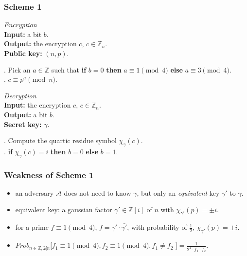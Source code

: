 \documentclass{beamer}
\begin{document}
\begin{frame}
\frametitle{Scheme 1 \cite{p}}
	
		\textit{Encryption} \\

		 \textbf{Input:} a bit $b$. \\
			 \textbf{Output:} the encryption $c$, $c  \in \mathbb{Z}_n$.  \\
			 \textbf{Public key:} $(n,p)$.
			 
			 
		\bigskip
			 
		. Pick an $a \in \mathbb{Z}$ such that \textbf{if} $b =0$ \textbf{then} $a \equiv 1 \pmod{4}$
		\textbf{else}  $a \equiv 3 \pmod{4}$. \\
	    . $c \equiv p^a \pmod{n}$. \\ 
		
		\bigskip
		
		
		\textit{Decryption} \\
		
		 \textbf{Input:} the encryption $c$, $c \in \mathbb{Z}_n$. \\
				 \textbf{Output:} a bit $b$. \\
				 \textbf{Secret key:} $\gamma$.
				 
		\bigskip
			
			
		 . Compute the quartic residue symbol $ \chi_{\gamma} (c)$. \\   
		. \textbf{if} $\chi_{\gamma} (c) =i$ \textbf{then} $b = 0$  \textbf{else} {$b = 1$\;}.\\

\end{frame}


\begin{frame}
\frametitle{Weakness of Scheme 1}

	\begin{itemize}
		\item  an adversary 
		  $\mathcal{A}$ does not need to know $\gamma$, 
		  but only an \textit{equivalent} key $\gamma'$
		  to $\gamma$. 
		\item  equivalent key: a gaussian factor $\gamma' \in \mathbb{Z}[i]$ of $n$ with
		  $\chi_{\gamma'}(p) = \pm i$.
		\item for a prime $f \equiv 1 \pmod{4}$, $f = \gamma' \cdot \bar{\gamma'} $, with probability of $\frac{1}{2}$,
		  $\chi_{\gamma'}(p) = \pm i$.    
		\item  $Prob_{n \in \mathbb{Z}, 2 \not | n}[ f_1 \equiv 1 \pmod{4}, f_2 \equiv 1 \pmod{4} , f_1 \not= f_2 $   $ ] = \frac{1}{ 2^2 \cdot f_1 \cdot f_2}$.    
	\end{itemize}
 
  \bigskip
  
 
  		
  
  


\end{frame}
\end{document}
